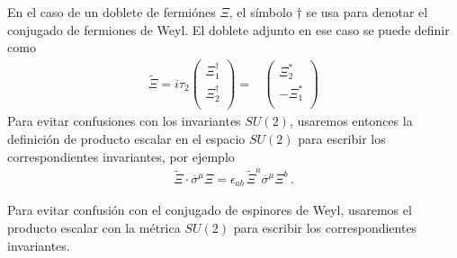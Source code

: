 \begin{frame}
En el caso de un doblete de fermiónes $\Xi$, el símbolo  $\dagger$ se usa para denotar el conjugado de fermiones de Weyl. El doblete adjunto en ese caso se puede definir como\begin{align}
\label{eq:Xiadj}
 \widetilde{\Xi}=i\tau_2 \begin{pmatrix}
                  \Xi_1^{\dagger}\\
                  \Xi_2^{\dagger}\\
                \end{pmatrix}
=& \begin{pmatrix}
                  \Xi_2^{*}\\
                 -\Xi_1^{*}\\
                \end{pmatrix}
\end{align}
Para evitar confusiones con los invariantes $SU(2)$, usaremos entonces la definición de producto escalar en el espacio $SU(2)$ para escribir los correspondientes invariantes, por ejemplo
\begin{align}
  \widetilde{\Xi}\cdot \overline{\sigma}^{\mu}\Xi=\epsilon_{ab}\,\widetilde{\Xi}^{a}\overline{\sigma}^{\mu}\Xi^{b}\,.
\end{align}

Para evitar confusión con el conjugado de espinores de Weyl, usaremos el producto escalar con la métrica $SU(2)$ para escribir los correspondientes invariantes.


\end{frame}
